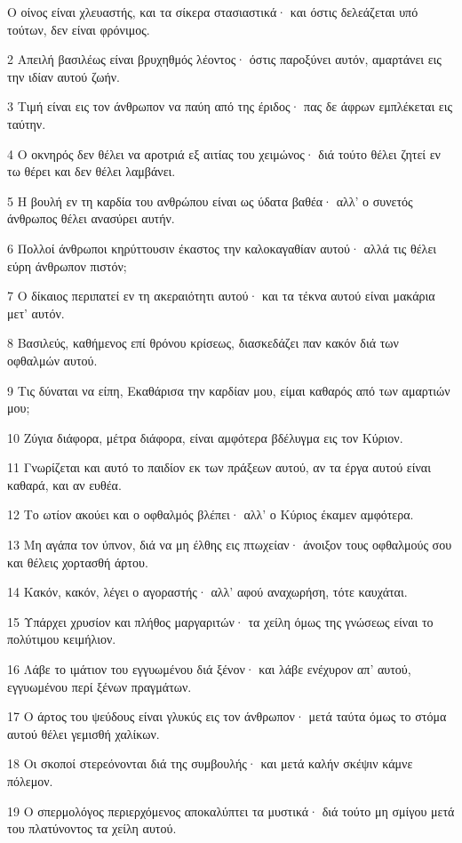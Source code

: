 \par Ο οίνος είναι χλευαστής, και τα σίκερα στασιαστικά· και όστις δελεάζεται υπό τούτων, δεν είναι φρόνιμος.
\par 2 Απειλή βασιλέως είναι βρυχηθμός λέοντος· όστις παροξύνει αυτόν, αμαρτάνει εις την ιδίαν αυτού ζωήν.
\par 3 Τιμή είναι εις τον άνθρωπον να παύη από της έριδος· πας δε άφρων εμπλέκεται εις ταύτην.
\par 4 Ο οκνηρός δεν θέλει να αροτριά εξ αιτίας του χειμώνος· διά τούτο θέλει ζητεί εν τω θέρει και δεν θέλει λαμβάνει.
\par 5 Η βουλή εν τη καρδία του ανθρώπου είναι ως ύδατα βαθέα· αλλ' ο συνετός άνθρωπος θέλει ανασύρει αυτήν.
\par 6 Πολλοί άνθρωποι κηρύττουσιν έκαστος την καλοκαγαθίαν αυτού· αλλά τις θέλει εύρη άνθρωπον πιστόν;
\par 7 Ο δίκαιος περιπατεί εν τη ακεραιότητι αυτού· και τα τέκνα αυτού είναι μακάρια μετ' αυτόν.
\par 8 Βασιλεύς, καθήμενος επί θρόνου κρίσεως, διασκεδάζει παν κακόν διά των οφθαλμών αυτού.
\par 9 Τις δύναται να είπη, Εκαθάρισα την καρδίαν μου, είμαι καθαρός από των αμαρτιών μου;
\par 10 Ζύγια διάφορα, μέτρα διάφορα, είναι αμφότερα βδέλυγμα εις τον Κύριον.
\par 11 Γνωρίζεται και αυτό το παιδίον εκ των πράξεων αυτού, αν τα έργα αυτού είναι καθαρά, και αν ευθέα.
\par 12 Το ωτίον ακούει και ο οφθαλμός βλέπει· αλλ' ο Κύριος έκαμεν αμφότερα.
\par 13 Μη αγάπα τον ύπνον, διά να μη έλθης εις πτωχείαν· άνοιξον τους οφθαλμούς σου και θέλεις χορτασθή άρτου.
\par 14 Κακόν, κακόν, λέγει ο αγοραστής· αλλ' αφού αναχωρήση, τότε καυχάται.
\par 15 Υπάρχει χρυσίον και πλήθος μαργαριτών· τα χείλη όμως της γνώσεως είναι το πολύτιμου κειμήλιον.
\par 16 Λάβε το ιμάτιον του εγγυωμένου διά ξένον· και λάβε ενέχυρον απ' αυτού, εγγυωμένου περί ξένων πραγμάτων.
\par 17 Ο άρτος του ψεύδους είναι γλυκύς εις τον άνθρωπον· μετά ταύτα όμως το στόμα αυτού θέλει γεμισθή χαλίκων.
\par 18 Οι σκοποί στερεόνονται διά της συμβουλής· και μετά καλήν σκέψιν κάμνε πόλεμον.
\par 19 Ο σπερμολόγος περιερχόμενος αποκαλύπτει τα μυστικά· διά τούτο μη σμίγου μετά του πλατύνοντος τα χείλη αυτού.
